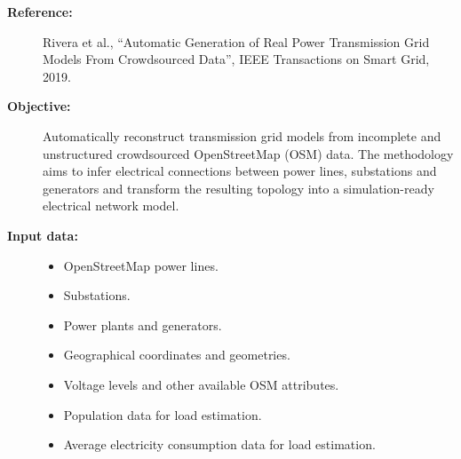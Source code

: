 \begin{description}

    \item[\textbf{Reference:}]
    Rivera et al., ``Automatic Generation of Real Power Transmission Grid
    Models From Crowdsourced Data'', IEEE Transactions on Smart Grid, 2019.

    \item[\textbf{Objective:}]
    Automatically reconstruct transmission grid models from incomplete and
    unstructured crowdsourced OpenStreetMap (OSM) data. The methodology aims
    to infer electrical connections between power lines, substations and
    generators and transform the resulting topology into a simulation-ready
    electrical network model.

    \item[\textbf{Input data:}] \hfill
    \begin{itemize}
        \item OpenStreetMap power lines.
        \item Substations.
        \item Power plants and generators.
        \item Geographical coordinates and geometries.
        \item Voltage levels and other available OSM attributes.
        \item Population data for load estimation.
        \item Average electricity consumption data for load estimation.
    \end{itemize}


\end{description}
